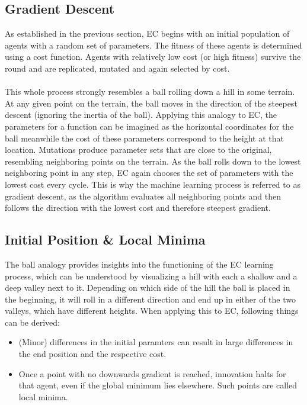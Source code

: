 \subsection{Gradient Descent}\label{subsec:gradient-descent}
As established in the previous section, EC begins with an initial population of agents with a random set of parameters.
The fitness of these agents is determined using a cost function.
Agents with relatively low cost (or high fitness) survive the round and are replicated, mutated and again selected by cost.
\\ \\
This whole process strongly resembles a ball rolling down a hill in some terrain.
At any given point on the terrain, the ball moves in the direction of the steepest descent (ignoring the inertia of the ball).
Applying this analogy to EC, the parameters for a function can be imagined as the horizontal coordinates for the ball meanwhile the cost of these parameters correspond to the height at that location.
Mutations produce parameter sets that are close to the original, resembling neighboring points on the terrain.
As the ball rolls down to the lowest neighboring point in any step, EC again chooses the set of parameters with the lowest cost every cycle.
This is why the machine learning process is referred to as gradient descent, as the algorithm evaluates all neighboring points and then follows the direction with the lowest cost and therefore steepest gradient.\cite{ibm2024}

\subsection{Initial Position \& Local Minima}\label{subsec:initial-position-&-local-minima}
The ball analogy provides insights into the functioning of the EC learning process, which can be understood by visualizing a hill with each a shallow and a deep valley next to it.
Depending on which side of the hill the ball is placed in the beginning, it will roll in a different direction and end up in either of the two valleys, which have different heights.
When applying this to EC, following things can be derived:
\begin{itemize}
    \item (Minor) differences in the initial paramters can result in large differences in the end position and the respective cost.
    \item Once a point with no downwards gradient is reached, innovation halts for that agent, even if the global minimum lies elsewhere.
    Such points are called local minima.
\end{itemize}

